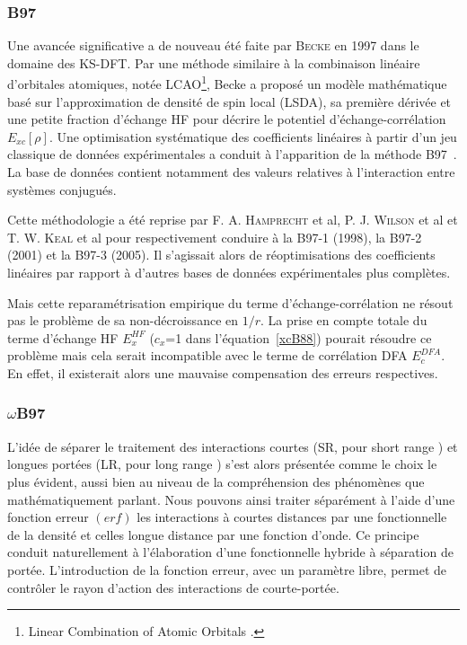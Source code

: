 \subsubsection{B97}

Une avancée significative a de nouveau été faite par \textsc{Becke} en 1997 dans le domaine des KS-DFT. Par une méthode similaire à la combinaison linéaire d'orbitales atomiques, notée LCAO\footnote{\og Linear Combination of Atomic Orbitals \fg{}.}, Becke a proposé un modèle mathématique basé sur l'approximation de densité de spin local (LSDA), sa première dérivée et une petite fraction d'échange HF pour décrire le potentiel d'échange-corrélation $E_{xc}[\rho]$. Une optimisation systématique des coefficients linéaires à partir d'un jeu classique de données expérimentales a conduit à l'apparition de la méthode B97~\cite{becke1997density}. La base de données contient notamment des valeurs relatives à l'interaction entre systèmes conjugués.

Cette méthodologie a été reprise par F. A. \textsc{Hamprecht} et al, P. J. \textsc{Wilson} et al et T. W. \textsc{Keal} et al pour respectivement conduire à la B97-1 \cite{hamprecht1998development} (1998), la B97-2 \cite{wilson2001hybrid} (2001) et la B97-3 \cite{keal2005semiempirical} (2005). Il s'agissait alors de réoptimisations des coefficients linéaires par rapport à d'autres bases de données expérimentales plus complètes.

Mais cette reparamétrisation empirique du terme d'échange-corrélation ne résout pas le problème de sa non-décroissance en $1/r$. La prise en compte totale du terme d'échange HF $E_{x}^{HF}$ ($c_{x}$=1 dans l'équation~\ref{xcB88}) pourait résoudre ce problème mais cela serait incompatible avec le terme de corrélation DFA $E_{c}^{DFA}$. En effet, il existerait alors une mauvaise compensation des erreurs respectives.

\subsubsection{$\omega$B97}

L'idée de séparer le traitement des interactions courtes (SR, pour \og short range \fg{}) et longues portées (LR, pour \og long range \fg{}) s'est alors présentée comme le choix le plus évident, aussi bien au niveau de la compréhension des phénomènes que mathématiquement parlant. Nous pouvons ainsi traiter séparément à l'aide d'une fonction erreur $(erf)$ les interactions à courtes distances par une fonctionnelle de la densité et celles longue distance par une fonction d'onde. Ce principe conduit naturellement à l'élaboration d'une fonctionnelle hybride à séparation de portée. L'introduction de la fonction erreur, avec un paramètre libre, permet de contrôler le rayon d'action des interactions de courte-portée.

